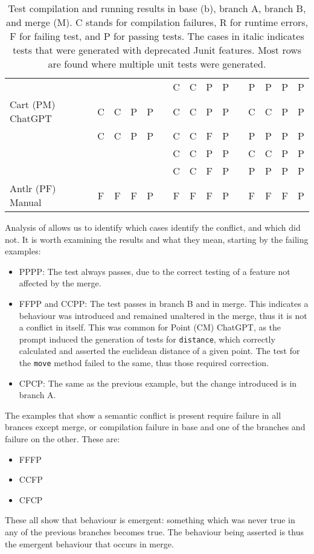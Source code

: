 \begin{table}[t]
\begin{tabular}{@{\extracolsep{\fill}} llcccccccccccccc}
                            & &   &   &   &   & & C & C & P & P & & P & P & P & P \\
Cart (PM) ChatGPT           & & C & C & P & P & & C & C & P & P & & C & C & P & P \\
                            & & C & C & P & P & & C & C & F & P & & P & P & P & P \\
                            & &   &   &   &   & & C & C & P & P & & C & C & P & P \\
                            & &   &   &   &   & & C & C & F & P & & P & P & P & P \\
Antlr (PF) Manual           & & F & F & F & P & & F & F & F & P & & F & F & F & P \\
        \bottomrule
    \end{tabular}
    \caption{Test compilation and running results in base (b), branch A,
    branch B, and merge (M).  C stands for compilation failures, R for runtime errors,
    F for failing test, and P for passing tests. The cases in italic indicates tests that were generated with deprecated Junit features.
    Most rows are found where multiple unit tests were generated.
    \label{tab:results:rq2tests}}
\end{table}


Analysis of  allows us to identify which cases identify the conflict, and which did not.
It is worth examining the results and what they mean, starting by the failing examples:
%
\begin{itemize}
  \item PPPP: The test always passes, due to the correct testing of a feature not affected by the merge.

  \item FFPP and CCPP: The test passes in branch B and in merge. This indicates a behaviour was introduced and remained unaltered in the merge, thus it is not a conflict in itself.
  This was common for Point (CM) ChatGPT, as the prompt induced the generation of tests for \texttt{distance}, which correctly calculated and asserted the euclidean distance of a given point.  The test for the \texttt{move} method failed to the same, thus those required correction.

  \item CPCP: The same as the previous example, but the change introduced is in branch A.
\end{itemize}
%
The examples that show a semantic conflict is present require failure in all brances except merge, or compilation failure in base and one of the branches and failure on the other.
These are:
\begin{itemize}
  \item FFFP
  \item CCFP
  \item CFCP
\end{itemize}
%
These all show that behaviour is emergent: something which was never true in any of the previous branches becomes true. The behaviour being asserted is thus the
emergent behaviour that occurs in merge.

